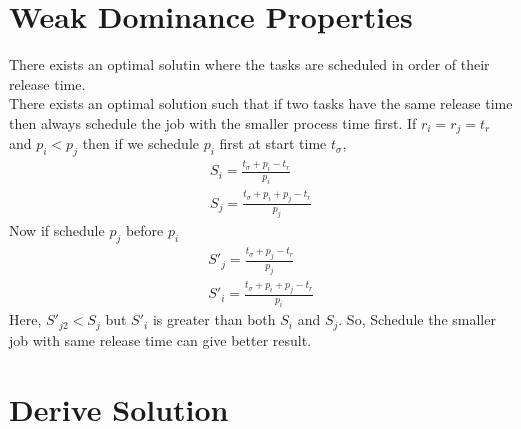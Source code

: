 \documentclass[11pt, conference, onecolumn]{IEEEtran}
\begin{document}
\section{Weak Dominance Properties}
There exists an optimal solutin where the tasks are scheduled in order of their release time. \\

There exists an optimal solution such that if two tasks have the same release time then always schedule the job with the smaller process time first. If $r_i=r_j=t_r$ and $p_i<p_j$ then if we schedule
$p_i$ first at start time $t_{\sigma}$, 
\begin{equation}
\begin{array}{l}
S_{i} = \frac{t_{\sigma} + p_i - t_r}{p_i} \\
S_{j} = \frac{t_{\sigma} + p_i + p_j- t_r}{p_j} 
\end{array}
\end{equation}
Now if schedule $p_j$ before $p_i$
\begin{equation}
\begin{array}{l}
S'_{j} = \frac{t_{\sigma} + p_j - t_r}{p_j} \\
S'_{i} = \frac{t_{\sigma} + p_i + p_j- t_r}{p_i} 
\end{array}
\end{equation}
Here, $S'_{j2} < S_{j}$ but $S'_{i}$ is greater than both $S_{i}$ and $S_{j}$. So, Schedule the smaller job with 
same release time can give better result.


\section{Derive Solution}
\end{document}
